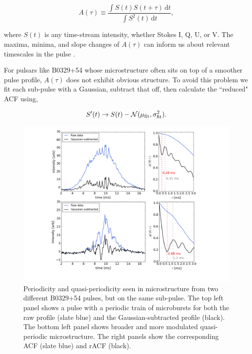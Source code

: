 \begin{equation}
A(\tau) \equiv \frac{\int S(t)S(t + \tau) \, \textrm{d}t}{\int S^2(t)
\, \textrm{d}t},
\end{equation}

\noindent where $S(t)$ is any time-stream intensity, 
whether Stokes I, Q, U, or V. 
The maxima, minima, and slope changes of $A(\tau)$ 
can inform us about relevant timescales in the pulse
\citep{2015ApJ...806..236M}. 

For pulsars like B0329+54 whose microstructure often 
sits on top of a smoother pulse profile, $A(\tau)$
does not exhibit obvious structure. To avoid this problem 
we fit each sub-pulse with a Gaussian, subtract 
that off, then calculate the ``reduced" ACF using,

\begin{equation}
S'(t) \rightarrow S(t) - \mathcal{N}(\mu_{\rm fit}, \sigma^2_{\rm fit}).
\end{equation}


\begin{figure}[!h]
\vspace{-0.1cm}
\begin{center}
\includegraphics[trim={2in 1in 2in 0in}, width=\textwidth]{./figures/microstructure/quasi_periodicity.jpeg}
\vspace{0.4cm}
\caption{Periodicity and quasi-periodicity seen in 
     microstructure from 
     two different B0329+54 pulses, but on the same sub-pulse. 
     The top left panel shows a pulse with a periodic train of microbursts
     for both the raw profile (slate blue) and the 
     Gaussian-subtracted profile (black). The bottom 
     left panel shows broader and more modulated 
     quasi-periodic microstructure. The right panels 
     show the corresponding ACF (slate blue) and rACF (black).
     }
\label{fig-quasistruct}
\end{center}
\end{figure}


